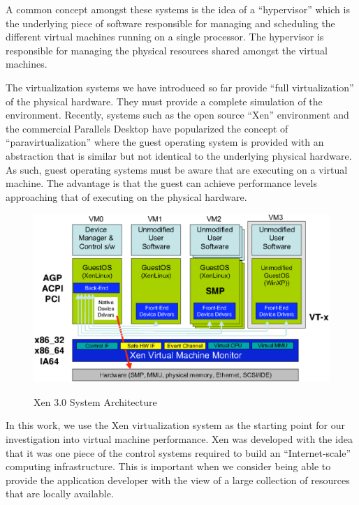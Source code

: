 \documentclass[preprint]{sigplanconf}
\begin{document}
A common concept amongst these systems is the idea of a ``hypervisor'' which
is the underlying piece of software responsible for managing and scheduling
the different virtual machines running on a single processor.  The hypervisor
is responsible for managing the physical resources shared amongst the virtual
machines. 

The virtualization systems we have introduced so far provide ``full
virtualization'' of the physical hardware.  They must provide a complete
simulation of the environment.  Recently, systems such as the open source
``Xen'' environment \cite{Barham2003} \cite{Abels2005} and the commercial
Parallels Desktop \cite{parallels2006} have popularized the concept of
``paravirtualization'' where the guest operating system is provided with an
abstraction that is similar but not identical to the underlying physical
hardware.  As such, guest operating systems must be aware that are executing
on a virtual machine.  The advantage is that the guest can achieve performance
levels approaching that of executing on the physical hardware.

\begin{figure}
  \centering
    \includegraphics[scale=0.65]{graphics/xen3arch.eps}
  \label{fig:XenArch}
  \caption{Xen 3.0 System Architecture \cite{Xen2006}}
\end{figure}
In this work, we use the Xen virtualization system \cite{Barham2003} as the
starting point for our investigation into virtual machine performance.   Xen
was developed with the idea that it was one piece of the control systems
required to build an ``Internet-scale'' computing infrastructure.  This is
important when we consider being able to provide the application developer
with the view of a large collection of resources that are locally available.
\end{document}

